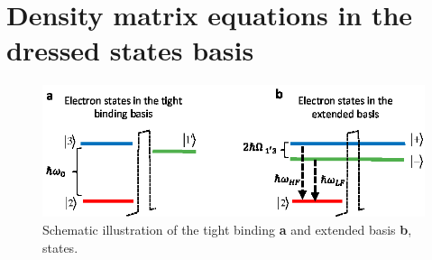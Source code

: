 \documentclass[]{spie}  %
\begin{document}
\section{Density matrix equations in the dressed states basis}
\begin{figure}[h!]
	\begin{center}
		\includegraphics[scale=1]{IMGS/BASISPICTURE.eps}
		\caption{ Schematic illustration of the tight binding \textbf{a} and extended basis \textbf{b}, states.  } \label{fig:basis_schemata}
	\end{center}	
\end{figure}
 
\end{document}

